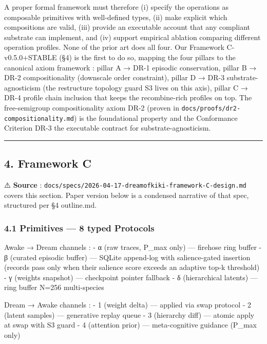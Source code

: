 \documentclass[
]{article}
\begin{document}
A proper formal framework must therefore (i) specify the operations as
composable primitives with well-defined types, (ii) make explicit which
compositions are valid, (iii) provide an executable account that any
compliant substrate can implement, and (iv) support empirical ablation
comparing different operation profiles. None of the prior art does all
four. Our Framework C-v0.5.0+STABLE (§4) is the first to do so, mapping
the four pillars to the canonical axiom framework : pillar A → DR-1
episodic conservation, pillar B → DR-2 compositionality (downscale order
constraint), pillar D → DR-3 substrate-agnosticism (the restructure
topology guard S3 lives on this axis), pillar C → DR-4 profile chain
inclusion that keeps the recombine-rich profiles on top. The
free-semigroup compositionality axiom DR-2 (proven in
\texttt{docs/proofs/dr2-compositionality.md}) is the foundational
property and the Conformance Criterion DR-3 the executable contract for
substrate-agnosticism.

\begin{center}\rule{0.5\linewidth}{0.5pt}\end{center}

\subsection{4. Framework C}\label{framework-c}

⚠️ \textbf{Source} :
\texttt{docs/specs/2026-04-17-dreamofkiki-framework-C-design.md} covers
this section. Paper version below is a condensed narrative of that spec,
structured per §4 outline.md.

\subsubsection{4.1 Primitives --- 8 typed
Protocols}\label{primitives-8-typed-protocols}

Awake → Dream channels : - α (raw traces, P\_max only) --- firehose ring
buffer - β (curated episodic buffer) --- SQLite append-log with
salience-gated insertion (records pass only when their salience score
exceeds an adaptive top-k threshold) - γ (weights snapshot) ---
checkpoint pointer fallback - δ (hierarchical latents) --- ring buffer
N=256 multi-species

Dream → Awake channels : - 1 (weight delta) --- applied via swap
protocol - 2 (latent samples) --- generative replay queue - 3 (hierarchy
diff) --- atomic apply at swap with S3 guard - 4 (attention prior) ---
meta-cognitive guidance (P\_max only)
\end{document}
